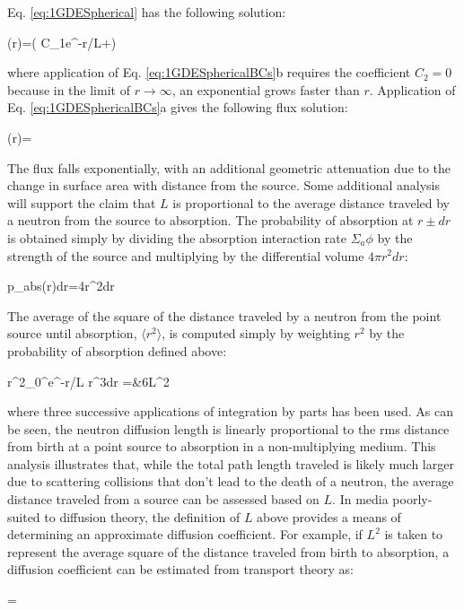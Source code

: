 Eq. \eqref{eq:1GDESpherical} has the following solution:

\beq
\phi(r)=\left( C_1e^{-r/L}+\right)
\eeq

where application of Eq. \eqref{eq:1GDESphericalBCs}b requires the coefficient \(C_2=0\) because in the limit of \(r\rightarrow\infty\), an exponential grows faster than \(r\). Application of Eq. \eqref{eq:1GDESphericalBCs}a gives the following flux solution:

\beq
\phi(r)=
\eeq

The flux falls exponentially, with an additional geometric attenuation due to the change in surface area with distance from the source. Some additional analysis will support the claim that \(L\) is proportional to the average distance traveled by a neutron from the source to absorption. The probability of absorption at \(r\pm dr\) is obtained simply by dividing the absorption interaction rate \(\Sigma_a\phi\) by the strength of the source and multiplying by the differential volume \(4\pi r^2dr\):

\beq
p_{abs}(r)dr=4\pi r^2dr
\eeq

The average of the square of the distance traveled by a neutron from the point source until absorption, \(\langle r^2\rangle\), is computed simply by weighting \(r^2\) by the probability of absorption defined above:

\beqa
\langle r^2\rangle\equiv{}\int_{0}^\infty e^{-r/L} r^3dr
=&6L^2
\eeqa

where three successive applications of integration by parts has been used. As can be seen, the neutron diffusion length is linearly proportional to the \gls{rms} distance from birth at a point source to absorption in a non-multiplying medium. This analysis illustrates that, while the total path length traveled is likely much larger due to scattering collisions that don't lead to the death of a neutron, the average distance traveled from a source can be assessed based on \(L\). In media poorly-suited to diffusion theory, the definition of \(L\) above provides a means of determining an approximate diffusion coefficient. For example, if \(L^2\) is taken to represent the average square of the distance traveled from birth to absorption, a diffusion coefficient can be estimated from transport theory as:

\beq
{}=
\eeq

